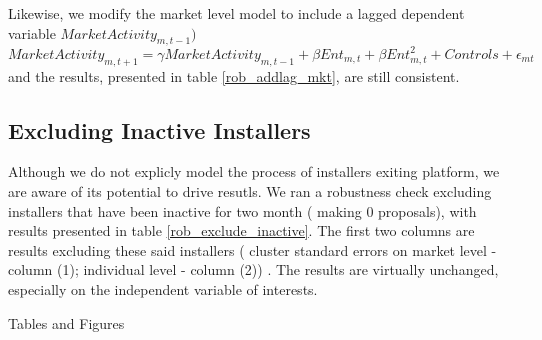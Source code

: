 \documentclass[msom,blindrev]{informs3}
\begin{document}
Likewise, we modify the market level model to include a lagged dependent variable $MarketActivity_{m,t-1})$
\begin{equation}
    MarketActivity_{m,t+1}=\gamma MarketActivity_{m,t-1}+\beta Ent_{m,t}+\beta Ent_{m,t}^2+Controls+\epsilon_{mt}
\end{equation} 
and the results, presented in table \ref{rob_addlag_mkt}, are still consistent. 




\subsection{Excluding Inactive Installers}
Although we do not explicly model the process of installers exiting platform, we are aware of its potential to drive resutls. We ran a robustness check excluding installers that have been inactive for two month ( making 0 proposals), with results presented in table \ref{rob_exclude_inactive}. The first two columns are results excluding these said installers ( cluster standard errors on market level - column (1); individual level - column (2)) . The results are virtually unchanged, especially on the independent variable of interests. 

\clearpage
\begin{APPENDIX}{Tables and Figures}
 



\end{APPENDIX}
\clearpage
%
%
%


\end{document}

